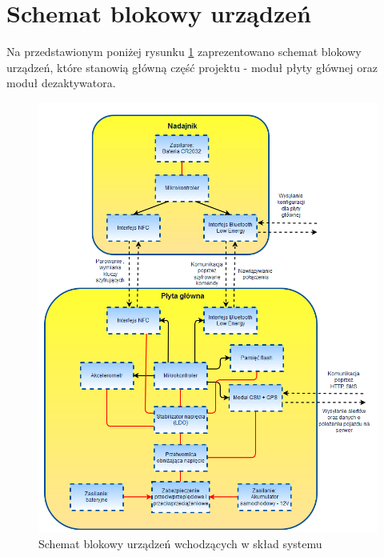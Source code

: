 \section{Schemat blokowy urządzeń}
\label{Schemat_blokowy_urządzen}
Na przedstawionym poniżej rysunku \ref{fig:image_device_block_diagram} zaprezentowano schemat blokowy urządzeń, które stanowią główną część projektu - moduł płyty głównej oraz moduł dezaktywatora. 

\begin{figure}[h]
	\centering
	\includegraphics[width=13cm]{img/introduction/device_block_diagram.jpg}
	\caption{Schemat blokowy urządzeń wchodzących w skład systemu}
	\label{fig:image_device_block_diagram}
\end{figure}
	
	
